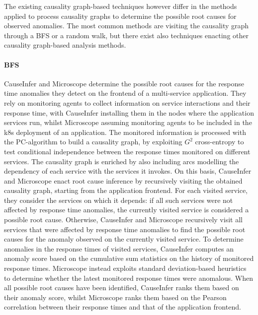 {The existing causality graph-based techniques however differ in the methods applied to process causality graphs to determine the possible root causes for observed anomalies.
The most common methods are visiting the causality graph through a BFS or a random walk, but there exist also techniques enacting other causality graph-based analysis methods.} 

\paragraph{{BFS}}
CauseInfer \cite{40_Chen2020_CauseInfer,48_Chen2014_CauseInfer} and Microscope \cite{06_Lin2018_Microscope,19_Guan2019_MicroscopeDemo} determine the possible root causes for the response time anomalies they detect on the frontend of a multi-service application.
They rely on monitoring agents to collect information on service interactions and their response time, with CauseInfer \cite{40_Chen2020_CauseInfer,48_Chen2014_CauseInfer} installing them in the nodes where the application services run, whilst Microscope \cite{06_Lin2018_Microscope,19_Guan2019_MicroscopeDemo} assuming monitoring agents to be included in the k8s deployment of an application.
The monitored information is processed with the PC-algorithm to build a causality graph, by exploiting $G^2$ cross-entropy \cite{Spirtes2000_CausationPredictionSearchPCAlgoritm} to test conditional independence between the response times monitored on different services.
The causality graph is enriched by also including arcs modelling the dependency of each service with the services it invokes.
On this basis, CauseInfer \cite{40_Chen2020_CauseInfer} and Microscope \cite{06_Lin2018_Microscope,19_Guan2019_MicroscopeDemo} enact root cause inference by recursively visiting the obtained causality graph, starting from the application frontend.
For each visited service, they consider the services on which it depends: if all such services were not affected by response time anomalies, the currently visited service is considered a possible root cause.
Otherwise, CauseInfer \cite{40_Chen2020_CauseInfer,48_Chen2014_CauseInfer} and Microscope \cite{06_Lin2018_Microscope,19_Guan2019_MicroscopeDemo} recursively visit all services that were affected by response time anomalies to find the possible root causes for the anomaly observed on the currently visited service.
To determine anomalies in the response times of visited services, CauseInfer \cite{40_Chen2020_CauseInfer,48_Chen2014_CauseInfer} computes an anomaly score based on the cumulative sum statistics on the history of monitored response times.
Microscope \cite{06_Lin2018_Microscope,19_Guan2019_MicroscopeDemo} instead exploits standard deviation-based heuristics to determine whether the latest monitored response times were anomalous.
When all possible root causes have been identified, CauseInfer \cite{40_Chen2020_CauseInfer,48_Chen2014_CauseInfer} ranks them based on their anomaly score, whilst Microscope \cite{06_Lin2018_Microscope,19_Guan2019_MicroscopeDemo} ranks them based on the Pearson correlation between their response times and that of the application frontend.

